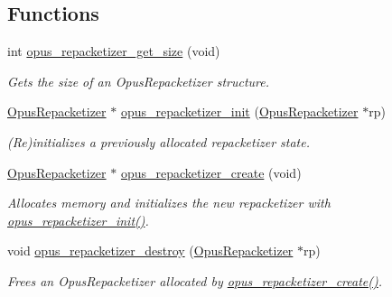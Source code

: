 \subsection*{Functions}
\begin{DoxyCompactItemize}
\item 
int \hyperlink{group__opus__repacketizer_ga35c8fc05764748d187c62fc50e812d06}{opus\_\-repacketizer\_\-get\_\-size} (void)
\begin{DoxyCompactList}\small\item\em Gets the size of an {\ttfamily OpusRepacketizer} structure. \item\end{DoxyCompactList}\item 
\hyperlink{group__opus__repacketizer_ga1f85070a64bcbf5bf24f5ccb80323e7b}{OpusRepacketizer} $\ast$ \hyperlink{group__opus__repacketizer_gab42ff7c3f8a49ff5029fcf60f3b853f0}{opus\_\-repacketizer\_\-init} (\hyperlink{group__opus__repacketizer_ga1f85070a64bcbf5bf24f5ccb80323e7b}{OpusRepacketizer} $\ast$rp)
\begin{DoxyCompactList}\small\item\em (Re)initializes a previously allocated repacketizer state. \item\end{DoxyCompactList}\item 
\hyperlink{group__opus__repacketizer_ga1f85070a64bcbf5bf24f5ccb80323e7b}{OpusRepacketizer} $\ast$ \hyperlink{group__opus__repacketizer_ga6f8813666ef851550ecf8658a731ff7d}{opus\_\-repacketizer\_\-create} (void)
\begin{DoxyCompactList}\small\item\em Allocates memory and initializes the new repacketizer with \hyperlink{group__opus__repacketizer_gab42ff7c3f8a49ff5029fcf60f3b853f0}{opus\_\-repacketizer\_\-init()}. \item\end{DoxyCompactList}\item 
void \hyperlink{group__opus__repacketizer_gadb08b25d2a29a559c35774cfe2a1b886}{opus\_\-repacketizer\_\-destroy} (\hyperlink{group__opus__repacketizer_ga1f85070a64bcbf5bf24f5ccb80323e7b}{OpusRepacketizer} $\ast$rp)
\begin{DoxyCompactList}\small\item\em Frees an {\ttfamily OpusRepacketizer} allocated by \hyperlink{group__opus__repacketizer_ga6f8813666ef851550ecf8658a731ff7d}{opus\_\-repacketizer\_\-create()}. \item\end{DoxyCompactList}\item 

\end{DoxyCompactItemize}
